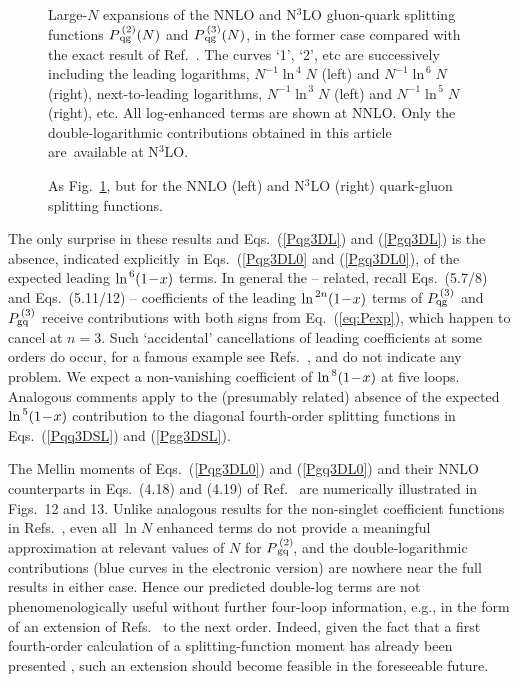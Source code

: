 \documentclass[12pt]{article}
\begin{document}
\begin{figure}[p]
\vspace*{-1mm}
\centerline{}
\vspace{-2mm}
\caption{\label{pic:fig12}
 Large-$N$ expansions of the NNLO and N$^3$LO gluon-quark splitting functions
 $P_{\,\rm qg}^{\,(2)}(N)$ and $P_{\,\rm qg}^{\,(3)}(N)$, in the former case
 compared with the exact result of Ref.~\cite{MVV4}.
 The curves `1', `2', etc are successively including the leading logarithms,
 $N^{-1}\ln^{\,4} N$ (left) and $N^{-1}\ln^{\,6} N$ (right),
 next-to-leading logarithms, $N^{-1}\ln^{\,3} N$ (left) and $N^{-1}\ln^{\,5} N$
 (right), etc. All log-enhanced terms are shown at NNLO. Only the
 double-logarithmic contributions obtained in this article are~available at
 N$^3$LO.
 }
\end{figure}
%
\begin{figure}[p]
\centerline{}
\vspace{-2mm}
\caption{\label{pic:fig13}
 As Fig.~\ref{pic:fig12}, but for the NNLO (left) and N$^3$LO (right)
 quark-gluon splitting functions.
 }
\vspace{-1mm}
\end{figure}
%
\noindent
The only surprise in these results and Eqs.~(\ref{Pqg3DL}) and (\ref{Pgq3DL}) is
the absence, indicated explicitly~in Eqs.~(\ref{Pqg3DL0} and (\ref{Pgq3DL0}),
of the expected leading $\ln^{\,6} \! \x1$ terms. In general the -- related, 
recall Eqs.~(5.7/8) and Eqs.~(5.11/12) -- coefficients of the leading 
$\ln^{\,2n} \! \x1$ terms of $P_{\rm qg}^{\,(3)}$ and $P_{\rm gq}^{\,(3)}$
receive contributions with both signs from Eq.~(\ref{eq:Pexp}), which happen to 
cancel at $n=3$. 
Such `accidental' cancellations of leading coefficients at some orders do occur,
for a famous example see Refs.~\cite{BFKL}, and do not indicate any problem. 
We expect a non-vanishing coefficient of $\ln^{\,8} \! \x1$ at five loops.
Analogous comments apply to the (presumably related) absence of the expected 
$\ln^{\,5} \! \x1$ contribution to the diagonal fourth-order splitting 
functions in Eqs.~(\ref{Pqq3DSL}) and (\ref{Pgg3DSL}).

The Mellin moments of Eqs.~(\ref{Pqg3DL0}) and (\ref{Pgq3DL0}) and their NNLO 
counterparts in Eqs.\ (4.18) and (4.19) of Ref.~\cite{MVV4} are numerically 
illustrated in Figs.~12 and 13. 
Unlike analogous results for the non-singlet coefficient functions in
Refs.~\cite{MV3,MV5}, even all $\ln N$ enhanced terms do not provide a 
meaningful approximation at relevant values of $N$ for $P_{\,\rm gq}^{\,(2)}\!$,
and the double-logarithmic contributions (blue curves in the electronic version)
are nowhere near the full results in either case.  
Hence our predicted double-log terms are not phenomenologically useful without 
further four-loop information, e.g., in the form of an extension of 
Refs.~\cite{Mom3loop} to the next order. Indeed, given the fact that a first 
fourth-order calculation of a splitting-function moment has already been 
presented \cite{Baikov:2006ai}, such an extension should become feasible in 
the foreseeable future.
%
%
\setcounter{equation}{0}
\end{document}
